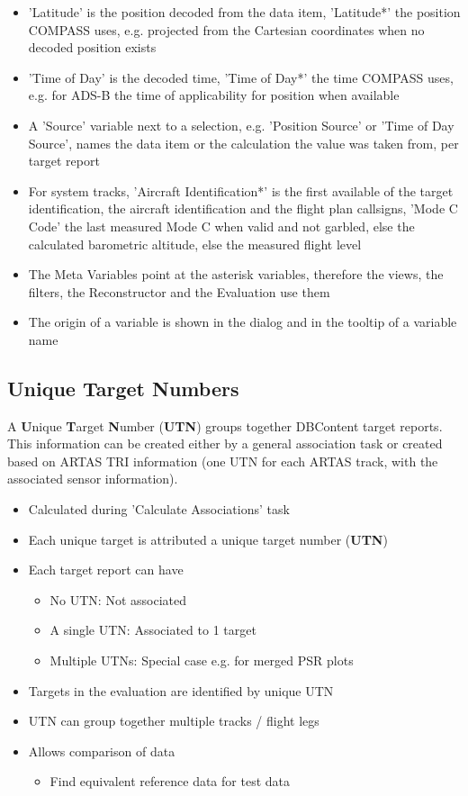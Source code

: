 \begin{itemize}
\item 'Latitude' is the position decoded from the data item, 'Latitude*' the position COMPASS uses, e.g. projected from the Cartesian coordinates when no decoded position exists
\item 'Time of Day' is the decoded time, 'Time of Day*' the time COMPASS uses, e.g. for ADS-B the time of applicability for position when available
\item A 'Source' variable next to a selection, e.g. 'Position Source' or 'Time of Day Source', names the data item or the calculation the value was taken from, per target report
\item For system tracks, 'Aircraft Identification*' is the first available of the target identification, the aircraft identification and the flight plan callsigns, 'Mode C Code' the last measured Mode C when valid and not garbled, else the calculated barometric altitude, else the measured flight level
\item The Meta Variables point at the asterisk variables, therefore the views, the filters, the Reconstructor and the Evaluation use them
\item The origin of a variable is shown in the  dialog and in the tooltip of a variable name
\end{itemize}

\subsection*{Unique Target Numbers}
A \textbf{U}nique \textbf{T}arget \textbf{N}umber (\textbf{UTN}) groups together DBContent target reports.
This information can be created either by a general association task or created based on ARTAS TRI information (one UTN for each ARTAS track, with the associated sensor information). \\

\begin{itemize}
\item Calculated during 'Calculate Associations' task
\item Each unique target is attributed a unique target number (\textbf{UTN})
\item Each target report can have
\begin{itemize}
\item No UTN: Not associated
\item A single UTN: Associated to 1 target
\item Multiple UTNs: Special case e.g. for merged PSR plots
\end{itemize}
\item Targets in the evaluation are identified by unique UTN
\item UTN can group together multiple tracks / flight legs
\item Allows comparison of data
\begin{itemize}
\item Find equivalent reference data for test data
\end{itemize}
\end{itemize}

